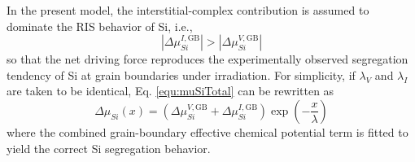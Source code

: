 \documentclass[12pt]{article}
\begin{document}
In the present model, the interstitial-complex contribution is assumed to dominate the RIS behavior of Si, i.e.,
\begin{equation}\label{equ:SiDominant}
\left|\Delta \mu_{Si}^{I,\mathrm{GB}}\right| >
\left|\Delta \mu_{Si}^{V,\mathrm{GB}}\right|
\end{equation}
so that the net driving force reproduces the experimentally observed segregation tendency of Si at grain boundaries under irradiation. For simplicity, if \(\lambda_V\) and \(\lambda_I\) are taken to be identical, Eq. \ref{equ:muSiTotal} can be rewritten as
\begin{equation}\label{equ:muSiSimplified}
\Delta \mu_{Si}(x)
=
\left(
\Delta \mu_{Si}^{V,\mathrm{GB}} + \Delta \mu_{Si}^{I,\mathrm{GB}}
\right)
\exp\left(-\frac{x}{\lambda}\right)
\end{equation}
where the combined grain-boundary effective chemical potential term is fitted to yield the correct Si segregation behavior.
\printbibliography
\end{document}

